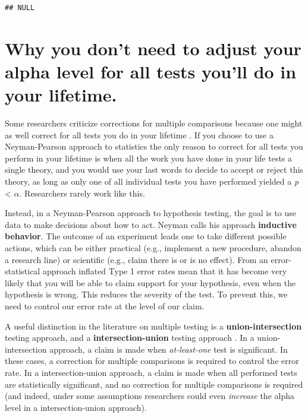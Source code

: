\documentclass[
  oneside]{book}
\begin{document}
\begin{verbatim}
## NULL
\end{verbatim}

\hypertarget{why-you-dont-need-to-adjust-your-alpha-level-for-all-tests-youll-do-in-your-lifetime.}{%
\section{Why you don't need to adjust your alpha level for all tests you'll do in your lifetime.}\label{why-you-dont-need-to-adjust-your-alpha-level-for-all-tests-youll-do-in-your-lifetime.}}

Some researchers criticize corrections for multiple comparisons because one might as well correct for all tests you do in your lifetime \citep{perneger_whats_1998}. If you choose to use a Neyman-Pearson approach to statistics the only reason to correct for all tests you perform in your lifetime is when all the work you have done in your life tests a single theory, and you would use your last words to decide to accept or reject this theory, as long as only one of all individual tests you have performed yielded a \emph{p} \textless{} \(\alpha\). Researchers rarely work like this.

Instead, in a Neyman-Pearson approach to hypothesis testing, the goal is to use data to make decisions about how to act. Neyman \citeyearpar{neyman_inductive_1957} calls his approach \textbf{inductive behavior}. The outcome of an experiment leads one to take different possible actions, which can be either practical (e.g., implement a new procedure, abandon a research line) or scientific (e.g., claim there is or is no effect). From an error-statistical approach \citep{mayo_statistical_2018} inflated Type 1 error rates mean that it has become very likely that you will be able to claim support for your hypothesis, even when the hypothesis is wrong. This reduces the severity of the test. To prevent this, we need to control our error rate at the level of our claim.

A useful distinction in the literature on multiple testing is a \textbf{union-intersection} testing approach, and a \textbf{intersection-union} testing approach \citep{dmitrienko_traditional_2013}. In a union-intersection approach, a claim is made when \emph{at-least-one} test is significant. In these cases, a correction for multiple comparisons is required to control the error rate. In a intersection-union approach, a claim is made when all performed tests are statistically significant, and no correction for multiple comparisons is required (and indeed, under some assumptions researchers could even \emph{increase} the alpha level in a intersection-union approach).
\end{document}
